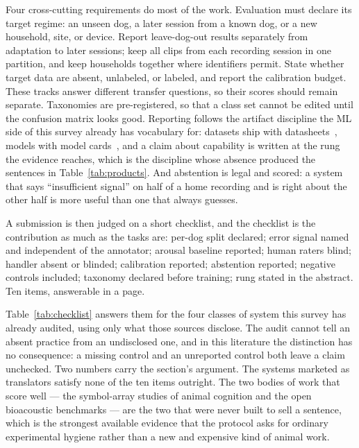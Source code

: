 Four cross-cutting requirements do most of the work. Evaluation must declare
its target regime: an unseen dog, a later session from a known dog, or a new
household, site, or device. Report leave-dog-out results separately from
adaptation to later sessions; keep all clips from each recording session in
one partition, and keep households together where identifiers permit. State
whether target data are absent, unlabeled, or labeled, and report the
calibration budget. These tracks answer different transfer questions, so
their scores should remain separate.
Taxonomies are pre-registered, so that a class set cannot be edited until the
confusion matrix looks good. Reporting follows the artifact discipline the
ML side of this survey already has vocabulary for: datasets ship with
datasheets~\cite{gebru2021datasheets}, models with model
cards~\cite{mitchell2019modelcards}, and a claim about capability is written at
the rung the evidence reaches, which is the discipline whose absence produced
the sentences in Table~\ref{tab:products}. And abstention is legal and scored:
a system that says ``insufficient signal'' on half of a home recording and is
right about the other half is more useful than one that always guesses.

A submission is then judged on a short checklist, and the checklist is the
contribution as much as the tasks are: per-dog split declared; error signal
named and independent of the annotator; arousal baseline reported; human
raters blind; handler absent or blinded; calibration reported; abstention
reported; negative controls included; taxonomy declared before training;
rung stated in the abstract. Ten items, answerable in a page.

Table~\ref{tab:checklist} answers them for the four classes of system this
survey has already audited, using only what those sources disclose. The audit
cannot tell an absent practice from an undisclosed one, and in this literature
the distinction has no consequence: a missing control and an unreported control
both leave a claim unchecked. Two numbers carry the section's argument. The
systems marketed as translators satisfy none of the ten items outright. The two
bodies of work that score well --- the symbol-array studies of
animal cognition and the open bioacoustic benchmarks --- are the two that were
never built to sell a sentence, which is the strongest available evidence that
the protocol asks for ordinary experimental hygiene rather than a new and
expensive kind of animal work.

